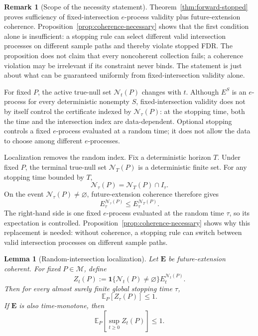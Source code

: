 \documentclass[11pt]{article}
\numberwithin{equation}{section}
\theoremstyle{plain}
\newtheorem{lemma}[theorem]{Lemma}
\theoremstyle{definition}
\newtheorem{remark}[theorem]{Remark}
\newcommand{\E}{\mathbb E}
\newcommand{\M}{\mathcal M}
\newcommand{\calN}{\mathcal N}
\newcommand{\one}{\mathbf 1}
\begin{document}
\begin{remark}[Scope of the necessity statement]\label{rem:coherence-necessity}
Theorem~\ref{thm:forward-stopped} proves sufficiency of fixed-intersection $e$-process validity plus future-extension coherence. Proposition~\ref{prop:coherence-necessary} shows that the first condition alone is insufficient: a stopping rule can select different valid intersection processes on different sample paths and thereby violate stopped FDR. The proposition does not claim that every noncoherent collection fails; a coherence violation may be irrelevant if its constraint never binds. The statement is just about what can be guaranteed uniformly from fixed-intersection validity alone.
\end{remark}

For fixed $P$, the active true-null set $\calN_t(P)$ changes with $t$. Although $E^S$ is an $e$-process for every deterministic nonempty $S$, fixed-intersection validity does not by itself control the certificate indexed by $\calN_\tau(P)$: at the stopping time, both the time and the intersection index are data-dependent. Optional stopping controls a fixed $e$-process evaluated at a random time; it does not allow the data to choose among different $e$-processes.

Localization removes the random index. Fix a deterministic horizon $T$. Under fixed $P$, the terminal true-null set $\calN_T(P)$ is a deterministic finite set. For any stopping time bounded by $T$,
\[
  \calN_\tau(P)=\calN_T(P)\cap I_\tau.
\]
On the event $\calN_\tau(P)\neq\varnothing$, future-extension coherence therefore gives
\[
  E_\tau^{\calN_\tau(P)}\leq E_\tau^{\calN_T(P)}.
\]
The right-hand side is one fixed $e$-process evaluated at the random time $\tau$, so its expectation is controlled. Proposition~\ref{prop:coherence-necessary} shows why this replacement is needed: without coherence, a stopping rule can switch between valid intersection processes on different sample paths.

\begin{lemma}[Random-intersection localization]\label{lem:random-intersection}
Let $\mathbf E$ be future-extension coherent. For fixed $P\in\M$, define
\[
  Z_t(P):=\one\{\calN_t(P)\neq\varnothing\}E_t^{\calN_t(P)}.
\]
Then for every almost surely finite global stopping time $\tau$,
\begin{equation}\label{eq:random-intersection-stopped}
  \E_P[Z_\tau(P)]\leq1.
\end{equation}
If $\mathbf E$ is also time-monotone, then
\begin{equation}\label{eq:random-intersection-max}
  \E_P\!\left[\sup_{t\geq0}Z_t(P)\right]\leq1.
\end{equation}
\end{lemma}
\end{document}
